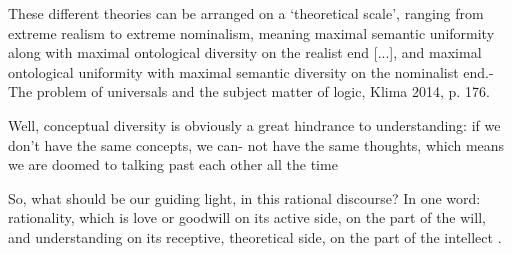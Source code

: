 \documentclass[]{article}
\begin{document}
These different theories can be arranged on a `theoretical scale', ranging from extreme realism to extreme nominalism, meaning maximal semantic uniformity along with maximal ontological diversity on the realist end [...], and maximal ontological uniformity with maximal semantic diversity on the nominalist end.- The problem of universals and the subject matter of logic, Klima 2014, p. 176.

Well, conceptual diversity is obviously
a great hindrance to understanding: if we don’t have the same concepts, we can-
not have the same thoughts, which means we are doomed to talking past each
other all the time\autocite[36]{Klima2021}

So, what should be our guiding light, in this rational discourse? In one word:
rationality, which is love or goodwill on its active side, on the part of the will, and
understanding on its receptive, theoretical side, on the part of the intellect \autocite[41]{Klima2021}.
\autocite{Parsons2014,Read2015b}

\printbibliography
\end{document}
